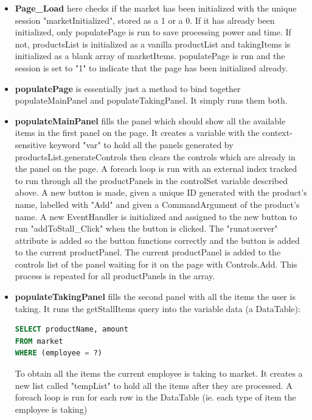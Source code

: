 ﻿\documentclass{article}
\begin{document}
    \begin{itemize}
        \item \textbf{Page\_Load} here checks if the market has been initialized with the unique session "marketInitialized", stored as a 1 or a 0.
        If it has already been initialized, only populatePage is run to save processing power and time.
        If not, productsList is initialized as a vanilla productList and takingItems is initialized as a blank array of marketItems.
        populatePage is run and the session is set to "1" to indicate that the page has been initialized already.
        \item \textbf{populatePage} is essentially just a method to bind together populateMainPanel and populateTakingPanel.
        It simply runs them both.
        \item \textbf{populateMainPanel} fills the panel which should show all the available items in the first panel on the page.
        It creates a variable with the context-sensitive keyword "var" to hold all the panels generated by productsList.generateControls then clears the controls which are already in the panel on the page.
        A foreach loop is run with an external index tracked to run through all the productPanels in the controlSet variable described above.
        A new button is made, given a unique ID generated with the product's name, labelled with "Add" and given a CommandArgument of the product's name.
        A new EventHandler is initialized and assigned to the new button to run "addToStall\_Click" when the button is clicked.
        The "runat:server" attribute is added so the button functions correctly and the button is added to the current productPanel.
        The current productPanel is added to the controls list of the panel waiting for it on the page with Controls.Add.
        This process is repeated for all productPanels in the array.
        \item \textbf{populateTakingPanel} fills the second panel with all the items the user is taking.
        It runs the getStallItems query into the variable data (a DataTable):
        \begin{lstlisting}[language=SQL]
SELECT productName, amount
FROM market
WHERE (employee = ?)
        \end{lstlisting}
        To obtain all the items the current employee is taking to market.
        It creates a new list called "tempList" to hold all the items after they are processed.
        A foreach loop is run for each row in the DataTable (ie. each type of item the employee is taking)

\end{itemize}
\end{document}

